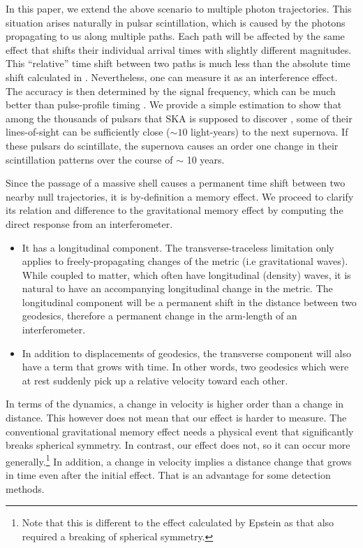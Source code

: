 \documentclass[aps,showpacs,onecolumn,floats,prd,superscriptaddress,nofootinbib]{revtex4-1}
\begin{document}
In this paper, we extend the above scenario to multiple photon trajectories.
This situation arises naturally in pulsar scintillation, which is caused by the photons propagating to us along multiple paths. 
Each path will be affected by the same effect that shifts their individual arrival times with slightly different magnitudes.
This ``relative'' time shift between two paths is much less than the absolute time shift calculated in \cite{Olum:2013gza, PhysRevD.93.103006}. 
Nevertheless, one can measure it as an interference effect.
The accuracy is then determined by the signal frequency, which can be much better than pulse-profile timing \cite{PenYan14}.
We provide a simple estimation to show that among the thousands of pulsars that SKA is supposed to discover \cite{MSPpopulation}, some of their lines-of-sight can be sufficiently close ($\sim 10$ light-years) to the next supernova.
If these pulsars do scintillate, the supernova causes an order one change in their scintillation patterns over the course of $\sim$ 10 years. 

Since the passage of a massive shell causes a permanent time shift between two nearby null trajectories, it is by-definition a memory effect.
We proceed to clarify its relation and difference to the gravitational memory effect \cite{Christodoulou_effect,GW_memory} by computing the direct response from an interferometer.


\begin{itemize}
\item It has a longitudinal component. The transverse-traceless limitation only applies to freely-propagating changes of the metric (i.e gravitational waves). 
While coupled to matter, which often have longitudinal (density) waves, it is natural to have an accompanying longitudinal change in the metric. 
The longitudinal component will be a permanent shift in the distance between two geodesics, therefore a permanent change in the arm-length of an interferometer.
\item In addition to displacements of geodesics, the transverse component will also have a term that grows with time. 
In other words, two geodesics which were at rest suddenly pick up a relative velocity toward each other.
\end{itemize}
In terms of the dynamics, a change in velocity is higher order than a change in distance.
This however does not mean that our effect is harder to measure. 
The conventional gravitational memory effect needs a physical event that significantly breaks spherical symmetry. 
In contrast, our effect does not, so it can occur more generally.\footnote{Note that this is different to the effect calculated by Epstein \cite{Epstein:1978dv} as that also required a breaking of spherical symmetry.}
In addition, a change in velocity implies a distance change that grows in time even after the initial effect. 
That is an advantage for some detection methods.  
\end{document}
